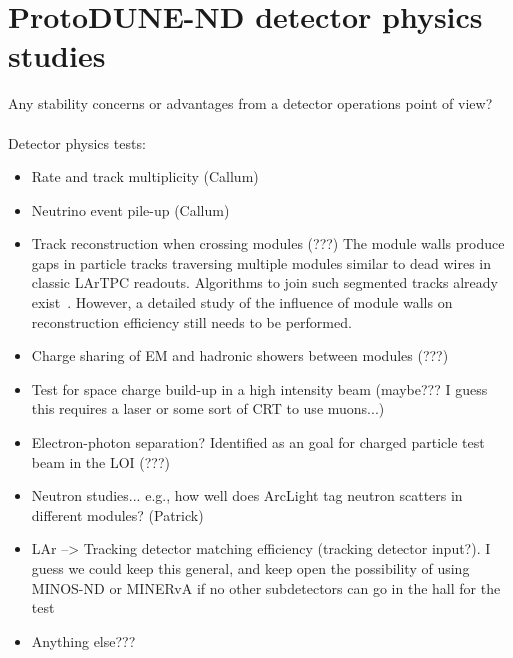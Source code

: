 \section{ProtoDUNE-ND detector physics studies}
\label{sec:detector-physics-studies}

Any stability concerns or advantages from a detector operations point of view?\\\\ 

Detector physics tests:
\begin{itemize}
\item Rate and track multiplicity (Callum)
\item Neutrino event pile-up (Callum)
\item Track reconstruction when crossing modules (???)
  The module walls produce gaps in particle tracks traversing multiple modules similar to dead wires in classic LArTPC readouts.
Algorithms to join such segmented tracks already exist~\cite{pandora}.
However, a detailed study of the influence of module walls on reconstruction efficiency still needs to be performed.

\item Charge sharing of EM and hadronic showers between modules (???)
\item Test for space charge build-up in a high intensity beam (maybe??? I guess this requires a laser or some sort of CRT to use muons...)
\item Electron-photon separation? Identified as an goal for charged particle test beam in the LOI (???)
\item Neutron studies... e.g., how well does ArcLight tag neutron scatters in different modules? (Patrick)
\item LAr --> Tracking detector matching efficiency (tracking detector input?). I guess we could keep this general, and keep open the possibility of using MINOS-ND or MINERvA if no other subdetectors can go in the hall for the test
\item Anything else???
\end{itemize}
